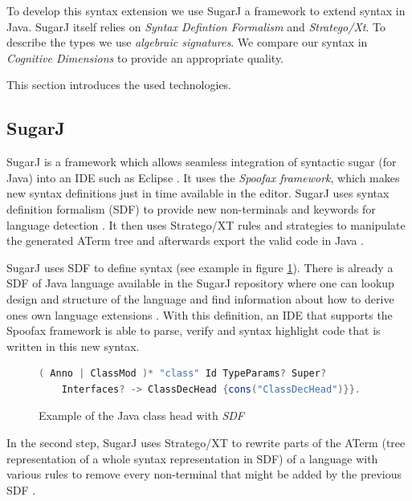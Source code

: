 \documentclass{report}
\begin{document}
To develop this syntax extension we use SugarJ a framework to extend syntax in Java. SugarJ itself relies on \emph{Syntax Defintion Formalism} and \emph{Stratego/Xt}. To describe the types we use \emph{algebraic signatures}. We compare our syntax in \emph{Cognitive Dimensions} to provide an appropriate quality.

This section introduces the used technologies.

\subsection{SugarJ}

SugarJ is a framework which allows seamless integration of syntactic sugar (for Java) into an IDE such as Eclipse \cite{Erdweg-SugarJ-2011}. It uses the \emph{Spoofax framework}, which makes new syntax definitions just in time available in the editor. SugarJ uses syntax definition formalism (SDF) to provide new non-terminals and keywords for language detection \cite{Heering-SDF-1989}. It then uses Stratego/XT rules and strategies to manipulate the generated ATerm tree and afterwards export the valid code in Java \cite{Kats-Spoofax-2010, Brand-ATerms-2000}.

SugarJ uses SDF to define syntax (see example in figure \ref{exampleSDFJavaClassDecHead}). There is already a SDF of Java language available in the SugarJ repository where one can lookup design and structure of the language and find information about how to derive ones own language extensions \cite{Heering-SDF-1989, Brand-SDF-2007, Java-SDF-2014}. With this definition, an IDE that supports the Spoofax framework is able to parse, verify and syntax highlight code that is written in this new syntax.

\begin{figure}[H]
\begin{lstlisting}[language=java,breaklines=false]
( Anno | ClassMod )* "class" Id TypeParams? Super? 
    Interfaces? -> ClassDecHead {cons("ClassDecHead")}}.
\end{lstlisting}
\caption{Example of the Java class head with \emph{SDF} \cite{Java-SDF-2014}}
\label{exampleSDFJavaClassDecHead}
\end{figure}

In the second step, SugarJ uses Stratego/XT to rewrite parts of the ATerm (tree representation of a whole syntax representation in SDF) of a language with various rules to remove every non-terminal that might be added by the previous SDF \cite{Stratego-Manual, Kats-Spoofax-2010, Brand-ATerms-2000, Visser-Stratego-2003}.
\end{document}
